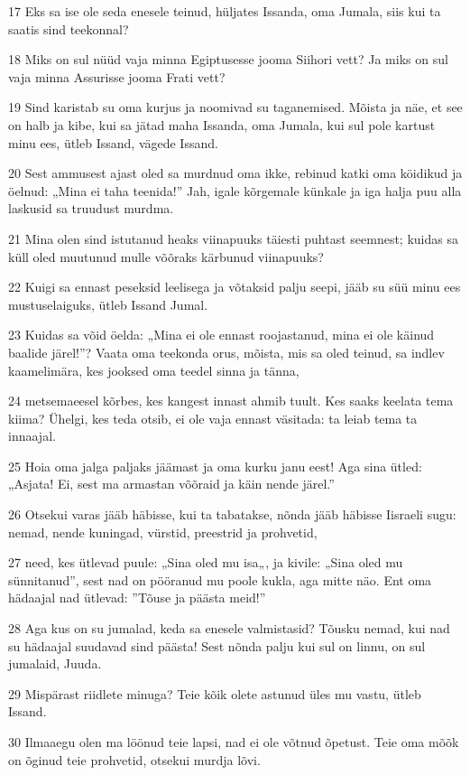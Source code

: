 \par 17 Eks sa ise ole seda enesele teinud, hüljates Issanda, oma Jumala, siis kui ta saatis sind teekonnal?
\par 18 Miks on sul nüüd vaja minna Egiptusesse jooma Siihori vett? Ja miks on sul vaja minna Assurisse jooma Frati vett?
\par 19 Sind karistab su oma kurjus ja noomivad su taganemised. Mõista ja näe, et see on halb ja kibe, kui sa jätad maha Issanda, oma Jumala, kui sul pole kartust minu ees, ütleb Issand, vägede Issand.
\par 20 Sest ammusest ajast oled sa murdnud oma ikke, rebinud katki oma köidikud ja öelnud: „Mina ei taha teenida!” Jah, igale kõrgemale künkale ja iga halja puu alla laskusid sa truudust murdma.
\par 21 Mina olen sind istutanud heaks viinapuuks täiesti puhtast seemnest; kuidas sa küll oled muutunud mulle võõraks kärbunud viinapuuks?
\par 22 Kuigi sa ennast peseksid leelisega ja võtaksid palju seepi, jääb su süü minu ees mustuselaiguks, ütleb Issand Jumal.
\par 23 Kuidas sa võid öelda: „Mina ei ole ennast roojastanud, mina ei ole käinud baalide järel!”? Vaata oma teekonda orus, mõista, mis sa oled teinud, sa indlev kaamelimära, kes jooksed oma teedel sinna ja tänna,
\par 24 metsemaeesel kõrbes, kes kangest innast ahmib tuult. Kes saaks keelata tema kiima? Ühelgi, kes teda otsib, ei ole vaja ennast väsitada: ta leiab tema ta innaajal.
\par 25 Hoia oma jalga paljaks jäämast ja oma kurku janu eest! Aga sina ütled: „Asjata! Ei, sest ma armastan võõraid ja käin nende järel.”
\par 26 Otsekui varas jääb häbisse, kui ta tabatakse, nõnda jääb häbisse Iisraeli sugu: nemad, nende kuningad, vürstid, preestrid ja prohvetid,
\par 27 need, kes ütlevad puule: „Sina oled mu isa„, ja kivile: „Sina oled mu sünnitanud”, sest nad on pööranud mu poole kukla, aga mitte näo. Ent oma hädaajal nad ütlevad: ”Tõuse ja päästa meid!”
\par 28 Aga kus on su jumalad, keda sa enesele valmistasid? Tõusku nemad, kui nad su hädaajal suudavad sind päästa! Sest nõnda palju kui sul on linnu, on sul jumalaid, Juuda.
\par 29 Mispärast riidlete minuga? Teie kõik olete astunud üles mu vastu, ütleb Issand.
\par 30 Ilmaaegu olen ma löönud teie lapsi, nad ei ole võtnud õpetust. Teie oma mõõk on õginud teie prohvetid, otsekui murdja lõvi.
